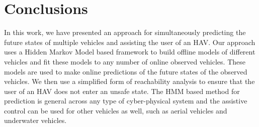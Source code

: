 \documentclass[letterpaper, 10 pt, conference]{ieeeconf}  %
\newcommand\NB[1]{$\spadesuit$\footnote{NB: #1}}
\begin{document}
\section{Conclusions} \label{sec:concs}
In this work, we have presented an approach for simultaneously predicting the future states of multiple vehicles and assisting the user of an HAV. Our approach uses a Hidden Markov Model based framework to build offline models of different vehicles and fit these models to any number of online observed vehicles. These models are used to make online predictions of the future states of the observed vehicles. We then use a simplified form of reachability analysis to ensure that the user of an HAV does not enter an unsafe state. The HMM based method for prediction is general across any type of cyber-physical system and the assistive control can be used for other vehicles as well, such as aerial vehicles and underwater vehicles.

%
%
%


  
  





\end{document}
